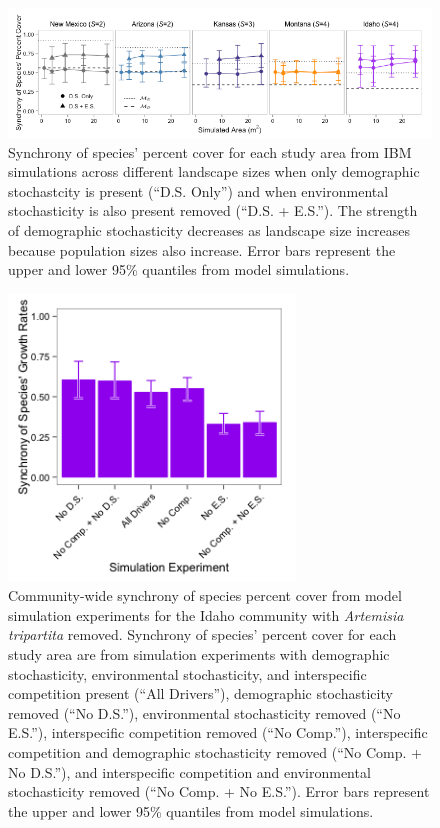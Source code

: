 \documentclass[12pt,]{article}
\begin{document}
\pagebreak{}

\begin{figure}[!ht]
  \centering
      \includegraphics[width=6in]{./components/formatted_figures/formatted_figureS3.png}
  \caption{Synchrony of species' percent cover for each study area from IBM simulations across different landscape sizes when only demographic stochastcity is present (``D.S. Only'') and when environmental stochasticity is also present removed (``D.S. + E.S.''). The strength of demographic stochasticity decreases as landscape size increases because population sizes also increase. Error bars represent the upper and lower 95\% quantiles from model simulations.}
\end{figure}

\pagebreak{}

\begin{figure}[!ht]
  \centering
      \includegraphics[width=3in]{./components/formatted_figures/formatted_figureS4.png}
  \caption{Community-wide synchrony of species percent cover from model simulation experiments for the Idaho community with \textit{Artemisia tripartita} removed. Synchrony of species' percent cover for each study area are from simulation experiments with demographic stochasticity, environmental stochasticity, and interspecific competition present (``All Drivers''), demographic stochasticity removed (``No D.S.''), environmental stochasticity removed (``No E.S.''), interspecific competition removed (``No Comp.''), interspecific competition and demographic stochasticity removed (``No Comp. + No D.S.''), and interspecific competition and environmental stochasticity removed (``No Comp. + No E.S.''). Error bars represent the upper and lower 95\% quantiles from model simulations.}
\end{figure}
\end{document}
